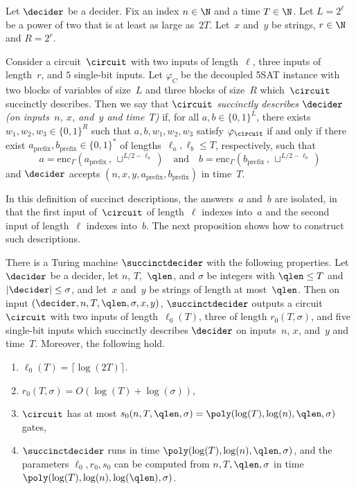 \begin{definition}
  Let $\decider$ be a decider.
  Fix an index $n \in \N$ and a time $T \in \N$.
  Let $L = 2^\ell$ be a power of two that is at least as large as~$2T$.
  Let~$x$ and~$y$ be strings, $r\in\N$ and $R=2^r$.

  Consider a circuit~$\circuit$ with two inputs of length~$\ell$, three inputs
  of length~$r$, and $5$ single-bit inputs.
  Let $\varphi_C$ be the decoupled 5SAT instance with two blocks of variables of
  size~$L$ and three blocks of size~$R$ which~$\circuit$ succinctly describes.
  Then we say that $\circuit$ \emph{succinctly describes $\decider$ (on
    inputs~$n$, $x$, and~$y$ and time~$T$)} if, for all $a, b \in \{0, 1\}^{L}$,
  there exists $w_1, w_2, w_3 \in \{0, 1\}^{R}$ such that $a, b, w_1, w_2, w_3$
  satisfy $\varphi_{\circuit}$ if and only if there exist $a_{\mathrm{prefix}},
  b_{\mathrm{prefix}} \in \{0, 1\}^*$ of lengths~$\ell_a, \ell_b \leq T$,
  respectively, such that
  \begin{equation*}
    a = \mathrm{enc}_\Gamma(a_{\mathrm{prefix}}\,,\, \sqcup^{L/2 - \ell_a})
  \quad
  \text{and}
  \quad
  b = \mathrm{enc}_\Gamma(b_{\mathrm{prefix}}\,,\, \sqcup^{L/2 - \ell_b})
  \end{equation*}
  and $\decider$ accepts $(n, x, y, a_{\mathrm{prefix}}, b_{\mathrm{prefix}})$
  in time~$T$.
\end{definition}

In this definition of succinct descriptions, the answers~$a$ and~$b$ are
isolated, in that the first input of~$\circuit$ of length~$\ell$ indexes
into~$a$ and the second input of length~$\ell$ indexes into~$b$.
The next proposition shows how to construct such descriptions.

\begin{proposition}
  \label{prop:explicit-succinct-deciders}
  There is a Turing machine $\succinctdecider$ with the following properties.
  Let $\decider$ be a decider, let $n$, $T$,~$\qlen$, and $\sigma$ be integers
  with $\qlen \leq T$ and $|\decider| \leq \sigma$, and let~$x$ and~$y$ be
  strings of length at most~$\qlen$.
  Then on input $(\decider, n, T, \qlen, \sigma, x, y)$, $\succinctdecider$
  outputs a circuit~$\circuit$ with two inputs of length~$\ell_0(T)$, three of
  length $r_0(T, \sigma)$, and five single-bit inputs which succinctly
  describes $\decider$ on inputs~$n$, $x$, and~$y$ and time~$T$.
  Moreover, the following hold.
  \begin{enumerate}
  \item $\ell_0(T) = \lceil \log(2T) \rceil$.
  \item $r_0(T,\sigma) = O(\log(T)+\log(\sigma))$,
  \item $\circuit$ has at most $s_0(n,T,\qlen,\sigma) = \poly(\log(T), \log(n),
    \qlen,\sigma)$ gates,
  \item $\succinctdecider$ runs in time $\poly(\log(T), \log(n),
    \qlen,\sigma)$, and the parameters $\ell_0, r_0, s_0$ can be computed
    from $n, T, \qlen,\sigma$ in time $\poly(\log(T), \log(n),
    \log(\qlen),\sigma)$.
  \end{enumerate}
\end{proposition}

